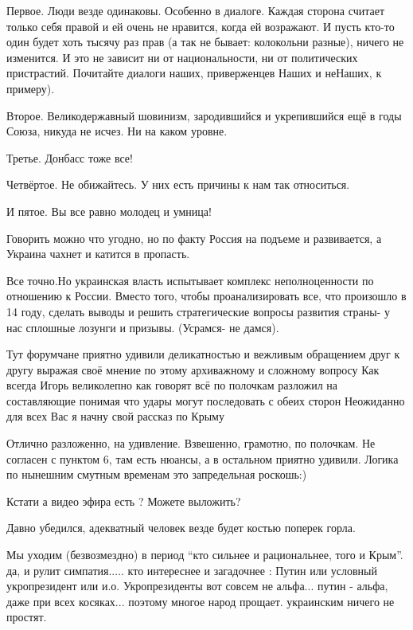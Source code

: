 \begin{itemize}

Первое. Люди везде одинаковы. Особенно в диалоге. Каждая сторона считает только
себя правой и ей очень не нравится, когда ей возражают. И пусть кто-то один
будет хоть тысячу раз прав (а так не бывает: колокольни разные), ничего не
изменится. И это не зависит ни от национальности, ни от политических
пристрастий. Почитайте диалоги наших, приверженцев Наших и неНаших, к примеру).

Второе. Великодержавный шовинизм, зародившийся и укрепившийся ещё в годы Союза,
никуда не исчез. Ни на каком уровне.

Третье. Донбасс тоже все!

Четвёртое. Не обижайтесь. У них есть причины к нам так относиться.

И пятое. Вы все равно молодец и умница!


Говорить можно что угодно, но по факту Россия на подъеме и развивается, а
Украина чахнет и катится в пропасть.


Все точно.Но украинская власть испытывает комплекс неполноценности по отношению
к России. Вместо того, чтобы проанализировать все, что произошло в 14 году,
сделать выводы и решить стратегические вопросы развития страны- у нас сплошные
лозунги и призывы. (Усрамся- не дамся).


Тут форумчане приятно удивили деликатностью и вежливым обращением друг к другу
выражая своё мнение по этому архиважному и сложному вопросу Как всегда Игорь
великолепно как говорят всё по полочкам разложил на составляющие понимая что
удары могут последовать с обеих сторон Неожиданно для всех Вас я начну свой
рассказ по Крыму



Отлично разложенно, на удивление. Взвешенно, грамотно, по полочкам. Не согласен
с пунктом 6, там есть нюансы, а в остальном приятно удивили. Логика по нынешним
смутным временам это запредельная роскошь:)


Кстати а видео эфира есть ? Можете выложить?

Давно убедился, адекватный человек везде будет костью поперек горла.

Мы уходим (безвозмездно) в период \enquote{кто сильнее и рациональнее, того и Крым}.
да, и рулит симпатия..... кто интереснее и загадочнее : Путин или условный укропрезидент или и.о.
Укропрезиденты вот совсем не альфа... путин - альфа, даже при всех косяках... поэтому многое народ прощает.
украинским ничего не простят.


\end{itemize}
